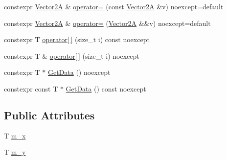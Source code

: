 \begin{DoxyCompactItemize}
\item 
constexpr \hyperlink{structmage_1_1_vector2_a}{Vector2A} \& \hyperlink{structmage_1_1_vector2_a_3_01_t_00_01typename_01std_1_1enable__if__t_3_01std_1_1is__arithmetic__b421e7a25afc1ac5972d3b452777021a_a0906b5813b7b8cf932c2423543cb5691}{operator=} (const \hyperlink{structmage_1_1_vector2_a}{Vector2A} \&v) noexcept=default
\item 
constexpr \hyperlink{structmage_1_1_vector2_a}{Vector2A} \& \hyperlink{structmage_1_1_vector2_a_3_01_t_00_01typename_01std_1_1enable__if__t_3_01std_1_1is__arithmetic__b421e7a25afc1ac5972d3b452777021a_a10d9c3d2ec3e045a69f4dbb761685e2a}{operator=} (\hyperlink{structmage_1_1_vector2_a}{Vector2A} \&\&v) noexcept=default
\item 
constexpr T \hyperlink{structmage_1_1_vector2_a_3_01_t_00_01typename_01std_1_1enable__if__t_3_01std_1_1is__arithmetic__b421e7a25afc1ac5972d3b452777021a_af6bebd6c871dac8e463e955134062442}{operator\mbox{[}$\,$\mbox{]}} (size\+\_\+t i) const noexcept
\item 
constexpr T \& \hyperlink{structmage_1_1_vector2_a_3_01_t_00_01typename_01std_1_1enable__if__t_3_01std_1_1is__arithmetic__b421e7a25afc1ac5972d3b452777021a_a6f6c4bf112fd5bb782fef3890b0958c0}{operator\mbox{[}$\,$\mbox{]}} (size\+\_\+t i) noexcept
\item 
constexpr T $\ast$ \hyperlink{structmage_1_1_vector2_a_3_01_t_00_01typename_01std_1_1enable__if__t_3_01std_1_1is__arithmetic__b421e7a25afc1ac5972d3b452777021a_a3585c99e49867ec4e893697b147937cd}{Get\+Data} () noexcept
\item 
constexpr const T $\ast$ \hyperlink{structmage_1_1_vector2_a_3_01_t_00_01typename_01std_1_1enable__if__t_3_01std_1_1is__arithmetic__b421e7a25afc1ac5972d3b452777021a_a7a8389a662e0216c0e8cb1c6f0b649d8}{Get\+Data} () const noexcept
\end{DoxyCompactItemize}
\subsection*{Public Attributes}
\begin{DoxyCompactItemize}
\item 
T \hyperlink{structmage_1_1_vector2_a_3_01_t_00_01typename_01std_1_1enable__if__t_3_01std_1_1is__arithmetic__b421e7a25afc1ac5972d3b452777021a_a0e0f036dcea7ca953e4007c5b67578bf}{m\+\_\+x}
\item 
T \hyperlink{structmage_1_1_vector2_a_3_01_t_00_01typename_01std_1_1enable__if__t_3_01std_1_1is__arithmetic__b421e7a25afc1ac5972d3b452777021a_a425ca4ed2df1460e7748e54e65ab5c35}{m\+\_\+y}
\end{DoxyCompactItemize}


